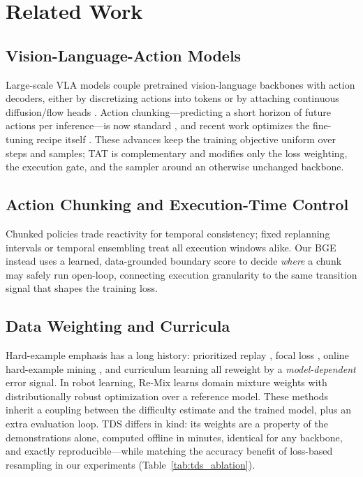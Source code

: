 \documentclass[letterpaper]{article} %
\newcommand{\method}{TAT} %
\newcommand{\bge}{BGE}    %
\newcommand{\tds}{TDS}    %
\begin{document}
\section{Related Work}

\subsection{Vision-Language-Action Models}
Large-scale VLA models couple pretrained vision-language backbones with action decoders, either by discretizing actions into tokens \cite{brohan2022rt1,brohan2023rt2,kim2024openvla} or by attaching continuous diffusion/flow heads \cite{octo2024,black2024pi0,chi2023diffusion}. Action chunking---predicting a short horizon of future actions per inference---is now standard \cite{zhao2023aloha,chi2023diffusion}, and recent work optimizes the fine-tuning recipe itself \cite{kim2025oft}. These advances keep the training objective uniform over steps and samples; \method{} is complementary and modifies only the loss weighting, the execution gate, and the sampler around an otherwise unchanged backbone.

\subsection{Action Chunking and Execution-Time Control}
Chunked policies trade reactivity for temporal consistency; fixed replanning intervals or temporal ensembling \cite{zhao2023aloha} treat all execution windows alike. Our \bge{} instead uses a learned, data-grounded boundary score to decide \emph{where} a chunk may safely run open-loop, connecting execution granularity to the same transition signal that shapes the training loss.

\subsection{Data Weighting and Curricula}
Hard-example emphasis has a long history: prioritized replay \cite{schaul2016prioritized}, focal loss \cite{lin2017focal}, online hard-example mining \cite{shrivastava2016ohem}, and curriculum learning \cite{bengio2009curriculum} all reweight by a \emph{model-dependent} error signal. In robot learning, Re-Mix \cite{hejna2024remix} learns domain mixture weights with distributionally robust optimization over a reference model. These methods inherit a coupling between the difficulty estimate and the trained model, plus an extra evaluation loop. \tds{} differs in kind: its weights are a property of the demonstrations alone, computed offline in minutes, identical for any backbone, and exactly reproducible---while matching the accuracy benefit of loss-based resampling in our experiments (Table~\ref{tab:tds_ablation}).
\end{document}
